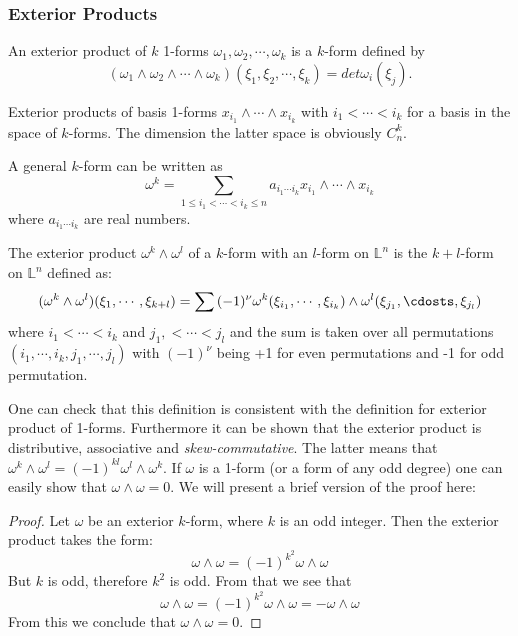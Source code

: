 \subsubsection{Exterior Products}
\begin{definition}
An exterior product of $k$ 1-forms $\omega_1,\omega_2,\cdots,\omega_k$ is
a $k$-form defined by
\begin{equation}
  (\omega_1\wedge\omega_2\wedge\cdots\wedge\omega_k)(\xi_1,\xi_2,\cdots,\xi_k)
  = det\omega_i(\xi_j).
\end{equation}
\end{definition}
\begin{remark}
  Exterior products of basis 1-forms $x_{i_1}\wedge\cdots\wedge x_{i_k}$ with
  $i_1<\cdots<i_k$ for a basis in the space of $k$-forms. The dimension the latter
  space is obviously $C_n^k$.
\end{remark}
A general $k$-form can be written as
\begin{equation}
  \omega^k = \sum_{1\leq i_1<\cdots<i_k\leq n}{a_{i_1\cdots
  i_k}x_{i_1}\wedge\cdots\wedge x_{i_k}}
\end{equation}
where $a_{i_1\cdots i_k}$ are real numbers.

\begin{definition}
  The exterior product $\omega^k\wedge\omega^l$ of a $k$-form with an $l$-form
  on $\mathbb{L}^n$ is the $k+l$-form on $\mathbb{L}^n$ defined as:
  \begin{equation}
    (\omega^k\wedge\omega^l)(\xi_1,\cdots,\xi_{k+l})
    = \sum{(-1)^\nu\omega^k(\xi_{i_1},\cdots,\xi_{i_k})\wedge\omega^l(\xi_{j_1},\cdosts,\xi_{j_l})}
  \end{equation}
  where $i_1<\cdots<i_k$ and $j_1,<\cdots<j_l$ and the sum is taken over all
  permutations $(i_1,\cdots,i_k,j_1,\cdots,j_l)$ with $(-1)^\nu$ being +1
  for even permutations and -1 for odd permutation.
\end{definition}
One can check that this definition is consistent with the definition for
exterior product of 1-forms. Furthermore it can be shown that the exterior
product is distributive, associative and \textit{skew-commutative}. The latter
means that $\omega^k\wedge\omega^l = (-1)^{kl}\omega^l\wedge\omega^k$. If
$\omega$ is a 1-form (or a form of any odd degree) one can easily show that
$\omega\wedge\omega=0$. We will present a brief version of the proof here:
\begin{proof}
Let $\omega$ be an exterior $k$-form, where $k$ is an odd integer. Then the
exterior product takes the form:
 \begin{equation}
 \omega\wedge\omega = (-1)^{k^2}\omega\wedge\omega
 \end{equation}
 But $k$ is odd, therefore $k^2$ is odd. From that we see that
 \begin{equation}
   \omega\wedge\omega = (-1)^k^2\omega\wedge\omega = -\omega\wedge\omega
 \end{equation}
 From this we conclude that $\omega\wedge\omega = 0$.
\end{proof}
